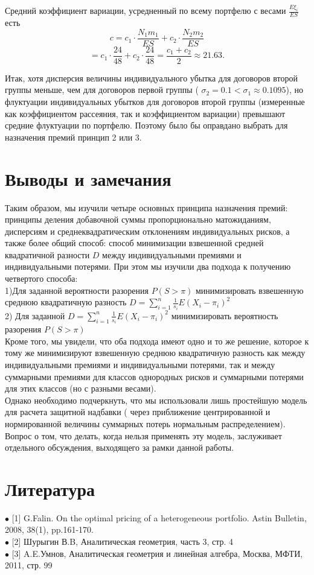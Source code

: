 \documentclass[12pt,a4paper]{article}
\begin{document}
Средний коэффициент вариации, усредненный по всему портфелю с весами $\frac{E\xi_i}{ES} $ есть
$$c = c_1 \cdot \frac{N_1m_1}{ES} + c_2 \cdot \frac{N_2m_2}{ES} $$
$$=c_1 \cdot \frac{24}{48} + c_2 \cdot \frac{24}{48} = \frac{c_1 + c_2}{2} \approx 21.63.$$

Итак, хотя дисперсия величины индивидуального убытка для договоров второй группы меньше, чем для договоров первой группы 
( $\sigma_2 = 0.1 < \sigma_1 \approx 0.1095 $), но флуктуации индивидуальных убытков для договоров второй группы (измеренные как коэффициентом рассеяния, так и коэффициентом вариации) превышают средние флуктуации по портфелю. Поэтому было бы оправдано выбрать для назначения премий принцип 2 или 3.



\section{ Выводы и замечания}
Таким образом, мы изучили четыре основных  принципа назначения премий: принципы деления добавочной суммы пропорционально матожиданиям, дисперсиям и среднеквадратическим отклонениям индивидуальных рисков, а также более общий способ: способ минимизации  взвешенной средней  квадратичной  разности  $D$ между индивидуальными премиями и индивидуальными потерями. При этом мы изучили два подхода к получению четвертого способа: \\
1)Для заданной вероятности разорения  $P(S>\pi)$ минимизировать взвешенную среднюю  квадратичную  разность  $D=\sum \limits_{i=1}^{n} \frac {1}{s_i} E(X_i-\pi_i)^2$ \\
 2) Для заданной $D=\sum \limits_{i=1}^{n} \frac {1}{s_i} E(X_i-\pi_i)^2$  минимизировать вероятность разорения $P(S>\pi)$\\
 Кроме того, мы увидели, что оба подхода имеют одно и то же решение, которое к тому же минимизируют взвешенную среднюю  квадратичную  разность  как между индивидуальными премиями и индивидуальными потерями, так и между суммарными премиями для классов однородных рисков и суммарными потерями для этих классов (но с разными весами).\\
Однако необходимо подчеркнуть, что мы использовали лишь простейшую модель для расчета защитной надбавки ( через приближение  центрированной и нормированной величины суммарных  потерь нормальным распределением). Вопрос о том, что делать, когда  нельзя применять эту модель,  заслуживает  отдельного обсуждения, выходящего за рамки данной работы.




\section{ Литература}

$\bullet$ [1] G.Falin. On the optimal pricing of a heterogeneous portfolio. Astin Bulletin, 2008, 38(1), pp.161-170. \\
$\bullet$ [2] Шурыгин В.B, Аналитическая геометрия, часть 3, стр. 4\\
$\bullet$ [3] A.E.Умнов,  Аналитическая геометрия и линейная алгебра, Москва, МФТИ, 2011, стр. 99\\
\end{document}
